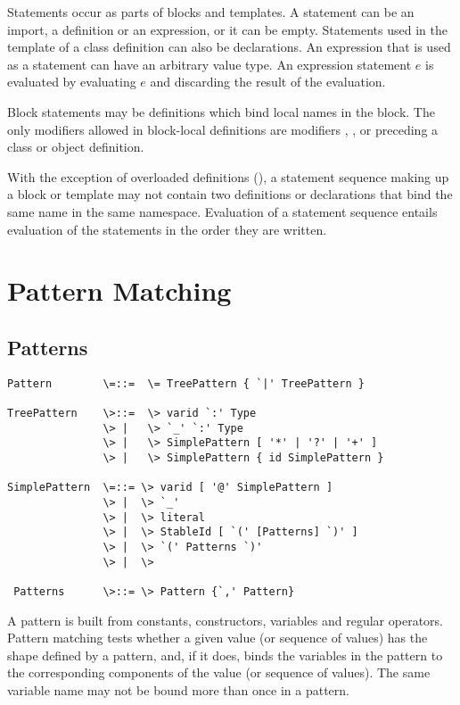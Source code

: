 \documentclass[11pt]{report}
\begin{document}
Statements occur as parts of blocks and templates.  A statement can be
an import, a definition or an expression, or it can be empty.
Statements used in the template of a class definition can also be
declarations.  An expression that is used as a statement can have an
arbitrary value type. An expression statement $e$ is evaluated by
evaluating $e$ and discarding the result of the evaluation. 

Block statements may be definitions which bind local names in the
block. The only modifiers allowed in block-local definitions are modifiers
\verb@abstract@, \verb@final@, or \verb@sealed@ preceding a class or
object definition.

With the exception of overloaded definitions
(), a statement sequence making up a block
or template may not contain two definitions or declarations that bind
the same name in the same namespace.  Evaluation of a statement
sequence entails evaluation of the statements in the order they are
written.

\chapter{Pattern Matching}

\section{Patterns}


\label{sec:patterns}

\syntax\begin{verbatim}
Pattern        \=::=  \= TreePattern { `|' TreePattern }

TreePattern    \>::=  \> varid `:' Type
               \> |   \> `_' `:' Type
               \> |   \> SimplePattern [ '*' | '?' | '+' ]
               \> |   \> SimplePattern { id SimplePattern }

SimplePattern  \=::= \> varid [ '@' SimplePattern ]
               \> |  \> `_'
               \> |  \> literal
               \> |  \> StableId [ `(' [Patterns] `)' ]
               \> |  \> `(' Patterns `)'
               \> |  \> 

 Patterns      \>::= \> Pattern {`,' Pattern}
\end{verbatim}

A pattern is built from constants, constructors, variables and regular
operators. Pattern matching tests whether a given value (or sequence
of values) has the shape defined by a pattern, and, if it does, binds
the variables in the pattern to the corresponding components of the
value (or sequence of values).  The same variable name may not be
bound more than once in a pattern.
\end{document}
